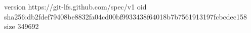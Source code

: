 version https://git-lfs.github.com/spec/v1
oid sha256:db2fdef79408be8832fa04cd00bf9933438f64018b7b7561913197fcbcdec158
size 349692
